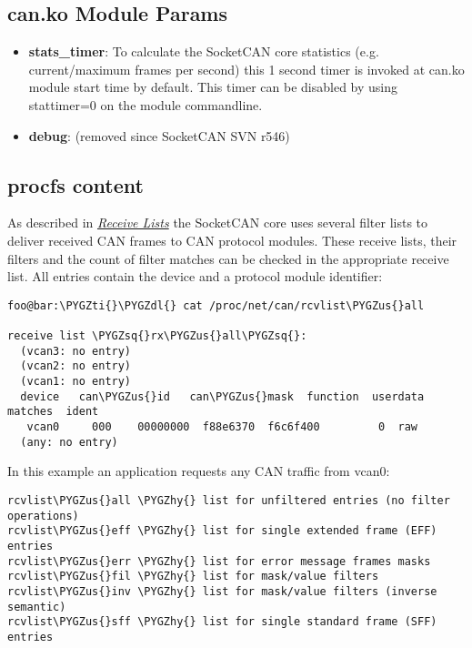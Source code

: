 \documentclass[a4paper,8pt,english]{sphinxmanual}
\def\PYGZus{\char`\_}
\def\PYGZdl{\char`\$}
\def\PYGZhy{\char`\-}
\def\PYGZsq{\char`\'}
\def\PYGZti{\char`\~}
\renewcommand\PYGZsq{\textquotesingle}
\begin{document}
\subsection{can.ko Module Params}
\label{networking/can:can-ko-module-params}\begin{itemize}
\item {} 
\textbf{stats\_timer}:
To calculate the SocketCAN core statistics
(e.g. current/maximum frames per second) this 1 second timer is
invoked at can.ko module start time by default. This timer can be
disabled by using stattimer=0 on the module commandline.

\item {} 
\textbf{debug}:
(removed since SocketCAN SVN r546)

\end{itemize}


\subsection{procfs content}
\label{networking/can:procfs-content}
As described in {\hyperref[networking/can:socketcan\string-receive\string-lists]{\emph{Receive Lists}}} the SocketCAN core uses several filter
lists to deliver received CAN frames to CAN protocol modules. These
receive lists, their filters and the count of filter matches can be
checked in the appropriate receive list. All entries contain the
device and a protocol module identifier:

\begin{Verbatim}[commandchars=\\\{\}]
foo@bar:\PYGZti{}\PYGZdl{} cat /proc/net/can/rcvlist\PYGZus{}all

receive list \PYGZsq{}rx\PYGZus{}all\PYGZsq{}:
  (vcan3: no entry)
  (vcan2: no entry)
  (vcan1: no entry)
  device   can\PYGZus{}id   can\PYGZus{}mask  function  userdata   matches  ident
   vcan0     000    00000000  f88e6370  f6c6f400         0  raw
  (any: no entry)
\end{Verbatim}

In this example an application requests any CAN traffic from vcan0:

\begin{Verbatim}[commandchars=\\\{\}]
rcvlist\PYGZus{}all \PYGZhy{} list for unfiltered entries (no filter operations)
rcvlist\PYGZus{}eff \PYGZhy{} list for single extended frame (EFF) entries
rcvlist\PYGZus{}err \PYGZhy{} list for error message frames masks
rcvlist\PYGZus{}fil \PYGZhy{} list for mask/value filters
rcvlist\PYGZus{}inv \PYGZhy{} list for mask/value filters (inverse semantic)
rcvlist\PYGZus{}sff \PYGZhy{} list for single standard frame (SFF) entries
\end{Verbatim}
\end{document}
